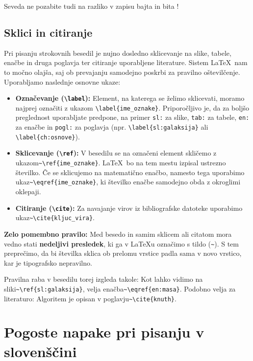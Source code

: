 \documentclass[a4paper,12pt,openright]{book}
\begin{document}
Seveda ne pozabite tudi na razliko v zapisu bajta \unit{\byte} in bita \unit{\bit}!

\section{Sklici in citiranje}

Pri pisanju strokovnih besedil je nujno dosledno sklicevanje na slike, tabele, enačbe in druga poglavja ter citiranje uporabljene literature. Sistem \LaTeX\ nam to močno olajša, saj ob prevajanju samodejno poskrbi za pravilno oštevilčenje. Uporabljamo naslednje osnovne ukaze:

\begin{itemize}
    \item \textbf{Označevanje (\texttt{\textbackslash label}):} Element, na katerega se želimo sklicevati, moramo najprej označiti z ukazom \verb|\label{ime_oznake}|. Priporočljivo je, da za boljšo preglednost uporabljate predpone, na primer \texttt{sl:} za slike, \texttt{tab:} za tabele, \texttt{en:} za enačbe in \texttt{pogl:} za poglavja (npr. \verb|\label{sl:galaksija}| ali \verb|\label{ch:osnove}|).
    
    \item \textbf{Sklicevanje (\texttt{\textbackslash ref}):} V besedilu se na označeni element skličemo z ukazom\verb|~\ref{ime_oznake}|. \LaTeX\ bo na tem mestu izpisal ustrezno številko. Če se sklicujemo na matematično enačbo, namesto tega uporabimo ukaz\verb|~\eqref{ime_oznake}|, ki številko enačbe samodejno obda z okroglimi oklepaji.
    
    \item \textbf{Citiranje (\texttt{\textbackslash cite}):} Za navajanje virov iz bibliografske datoteke uporabimo ukaz\verb|~\cite{kljuc_vira}|.
\end{itemize}

\textbf{Zelo pomembno pravilo:} Med besedo in samim sklicem ali citatom mora vedno stati \textbf{nedeljivi presledek}, ki ga v \LaTeX u označimo s tildo (\verb|~|). S tem preprečimo, da bi številka sklica ob prelomu vrstice padla sama v novo vrstico, kar je tipografsko nepravilno. 

Pravilna raba v besedilu torej izgleda takole: 
Kot lahko vidimo na sliki\verb|~\ref{sl:galaksija}|, velja enačba\verb|~\eqref{en:masa}|. 
Podobno velja za literaturo: Algoritem je opisan v poglavju\verb|~\cite{knuth}|.

\chapter{Pogoste napake pri pisanju v slovenščini}
\label{ch:slo}
\end{document}
